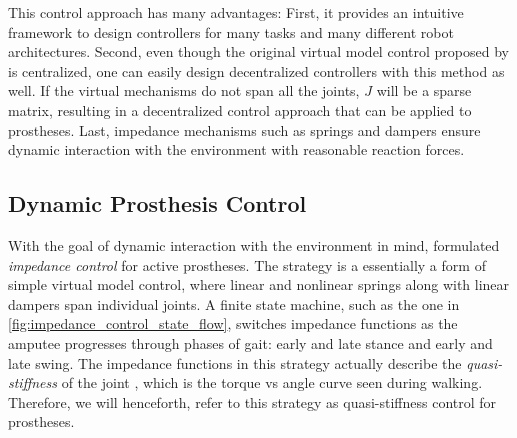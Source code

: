 This control approach has many advantages: First, it provides an intuitive
framework to design controllers for many tasks and many different robot
architectures. Second, even though the original virtual model control proposed
by \citeauthor{pratt2001virtual} is centralized, one can easily design
decentralized controllers with this method as well. If the virtual mechanisms do
not span all the joints, $J$ will be a sparse matrix, resulting in a
decentralized control approach that can be applied to prostheses. Last,
impedance mechanisms such as springs and dampers ensure dynamic interaction with
the environment with reasonable reaction forces.

\subsection{Dynamic Prosthesis Control}
With the goal of dynamic interaction with the environment in mind,
\citet{sup2007design} formulated \emph{impedance control} for active prostheses.
The strategy is a essentially a form of simple virtual model control, where
linear and nonlinear springs along with linear dampers span individual joints.
A finite state machine, such as the one in
\cref{fig:impedance_control_state_flow}, switches impedance functions as the
amputee progresses through phases of gait: early and late stance and early and
late swing. The impedance functions in this strategy actually describe the
\emph{quasi-stiffness} of the joint \citep{rouse2013difference}, which is the
torque vs angle curve seen during walking. Therefore, we will henceforth, refer
to this strategy as quasi-stiffness control for prostheses.

